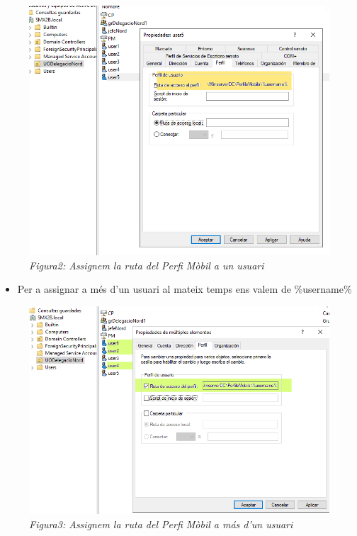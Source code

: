 \documentclass[
  a4paper,
]{article}
\providecommand{\tightlist}{%
  \setlength{\itemsep}{0pt}\setlength{\parskip}{0pt}}
\begin{document}
\begin{figure}
\centering
\includegraphics{png/RutaPerfils.png}
\caption{\emph{Figura2: Assignem la ruta del Perfi Mòbil a un usuari}}
\end{figure}

\begin{itemize}
\tightlist
\item
  Per a assignar a més d'un usuari al mateix temps ens valem de
  \%username\%
\end{itemize}

\begin{figure}
\centering
\includegraphics{png/RutaPerfils2.png}
\caption{\emph{Figura3: Assignem la ruta del Perfi Mòbil a más d'un
usuari}}
\end{figure}
\end{document}
